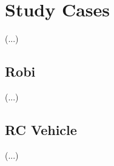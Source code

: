 \chapter{Study Cases} \label{chap:robi}

(...)\\

\lipsum[1]

\section{Robi}

(...)\\

\lipsum[2]

\section{RC Vehicle}

(...)\\

\lipsum[3]
